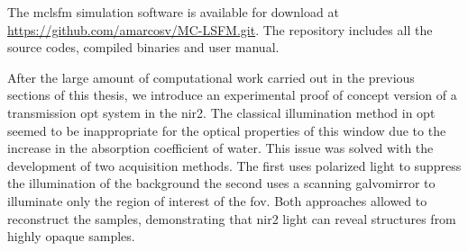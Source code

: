 The \gls{mclsfm} simulation software is available for download at \url{https://github.com/amarcosv/MC-LSFM.git}. The repository includes all the source codes, compiled binaries and user manual.

After the large amount of computational work carried out in the previous sections of this thesis, we introduce an experimental proof of concept version of a transmission \gls{opt} system in the \gls{nir2}. The classical illumination method in \gls{opt} seemed to be inappropriate for the optical properties of this window due to the increase in the absorption coefficient of water. This issue was solved with the development of two acquisition methods. The first uses polarized light to suppress the illumination of the background the second uses a scanning galvomirror to illuminate only the region of interest of the \gls{fov}. Both approaches allowed to reconstruct the samples, demonstrating that \gls{nir2} light can reveal structures from highly opaque samples. 

